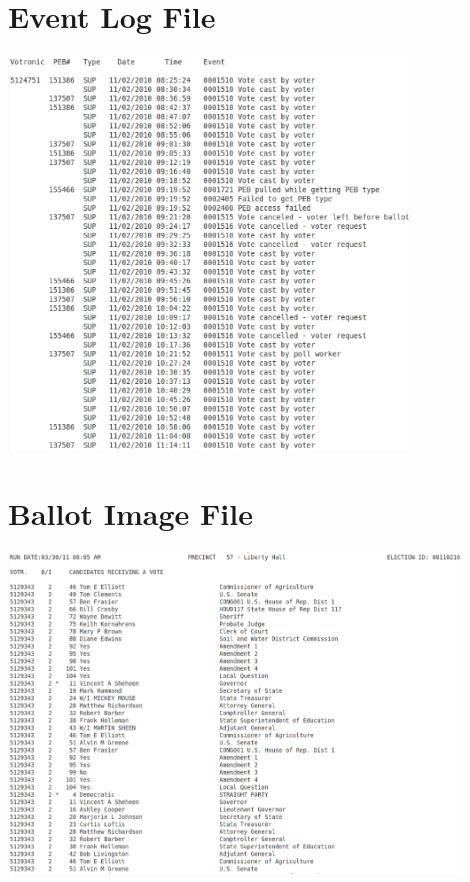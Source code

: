 \documentclass[letterpaper,twocolumn,10pt]{article}
\begin{document}

{\footnotesize 
}

\clearpage
\onecolumn
\begin{center}
\appendix
\section{Event Log File}\label{app:el} 
\includegraphics[width=0.8\textwidth]{eventLog.eps}

\clearpage
\section{Ballot Image File}\label{app:bi}
\includegraphics[width=0.9\textwidth]{ballot.eps}


\end{center}
\end{document}
